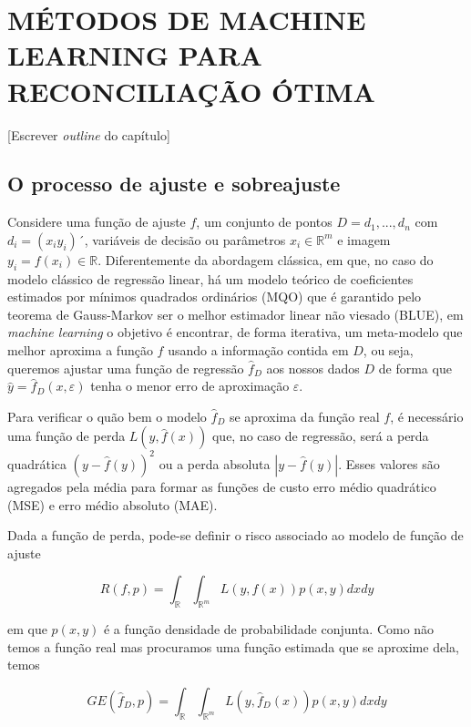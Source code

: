 \documentclass[
  12pt,
  oneside,
  a4paper,
  chapter=TITLE,
  section=TITLE,
  brazil]{abntex2}
\begin{document}
\hypertarget{muxe9todos-de-machine-learning-para-reconciliauxe7uxe3o-uxf3tima}{%
\section{MÉTODOS DE MACHINE LEARNING PARA RECONCILIAÇÃO
ÓTIMA}\label{muxe9todos-de-machine-learning-para-reconciliauxe7uxe3o-uxf3tima}}

{[}Escrever \emph{outline} do capítulo{]}

\hypertarget{o-processo-de-ajuste-e-sobreajuste}{%
\subsection{O processo de ajuste e
sobreajuste}\label{o-processo-de-ajuste-e-sobreajuste}}

Considere uma função de ajuste \(f\), um conjunto de pontos
\(D = {d_1, ..., d_n}\) com \(d_i = (x_i y_i)´\), variáveis de decisão
ou parâmetros \(x_i \in \mathbb{R}^m\) e imagem
\(y_i = f(x_i) \in \mathbb{R}\). Diferentemente da abordagem clássica,
em que, no caso do modelo clássico de regressão linear, há um modelo
teórico de coeficientes estimados por mínimos quadrados ordinários (MQO)
que é garantido pelo teorema de Gauss-Markov ser o melhor estimador
linear não viesado (BLUE), em \emph{machine learning} o objetivo é
encontrar, de forma iterativa, um meta-modelo que melhor aproxima a
função \(f\) usando a informação contida em \(D\), ou seja, queremos
ajustar uma função de regressão \(\hat{f}_D\) aos nossos dados \(D\) de
forma que \(\hat{y} = \hat{f}_D(x, \varepsilon)\) tenha o menor erro de
aproximação \(\varepsilon\).

Para verificar o quão bem o modelo \(\hat{f}_D\) se aproxima da função
real \(f\), é necessário uma função de perda \(L(y, \hat{f}(x))\) que,
no caso de regressão, será a perda quadrática \((y - \hat{f}(y))^2\) ou
a perda absoluta \(|y - \hat{f}(y)|\). Esses valores são agregados pela
média para formar as funções de custo erro médio quadrático (MSE) e erro
médio absoluto (MAE).

Dada a função de perda, pode-se definir o risco associado ao modelo de
função de ajuste

\[R(f, p) = \int_{\mathbb{R}}{}\int_{\mathbb{R}^m}{} L(y, f(x))p(x, y)dxdy\]

em que \(p(x, y)\) é a função densidade de probabilidade conjunta. Como
não temos a função real mas procuramos uma função estimada que se
aproxime dela, temos

\[GE(\hat{f}_D, p) = \int_{\mathbb{R}}{}\int_{\mathbb{R}^m}{} L(y, \hat{f}_D(x))p(x, y)dxdy \tag{1}\]
\end{document}
